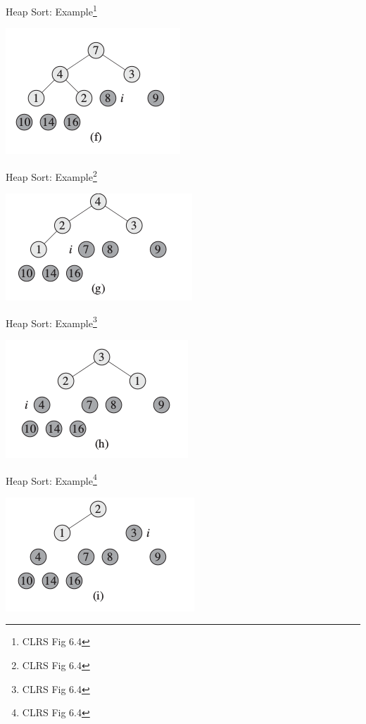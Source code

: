 \documentclass{beamer}
\begin{document}
\begin{frame}{Heap Sort: Example\footnote{CLRS Fig 6.4}}
    \begin{center}
        \includegraphics[scale=0.7]{heapSort6.png}
    \end{center}
\end{frame}


\begin{frame}{Heap Sort: Example\footnote{CLRS Fig 6.4}}
    \begin{center}
        \includegraphics[scale=0.7]{heapSort7.png}
    \end{center}
\end{frame}


\begin{frame}{Heap Sort: Example\footnote{CLRS Fig 6.4}}
    \begin{center}
        \includegraphics[scale=0.7]{heapSort8.png}
    \end{center}
\end{frame}


\begin{frame}{Heap Sort: Example\footnote{CLRS Fig 6.4}}
    \begin{center}
        \includegraphics[scale=0.7]{heapSort9.png}
    \end{center}
\end{frame}
\end{document}
